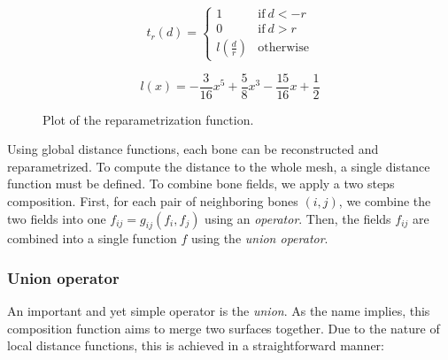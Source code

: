 \documentclass[a4paper,10pt]{article}
\begin{document}
\begin{multicols}{2}
\begin{equation*}
t_r(d) = \left\{ \begin{array}{ll}
1 & \mathrm{if\ }d < -r \\
0 & \mathrm{if\ }d > r \\
l(\frac{d}{r}) & \mathrm{otherwise}
\end{array} \right.
\end{equation*}

\begin{equation*}
l(x) = -\frac{3}{16}x^5 + \frac{5}{8}x^3 - \frac{15}{16}x + \frac{1}{2}
\end{equation*}

\begin{figure}[H]
\centering
{}
\caption{Plot of the reparametrization function.}
\end{figure}

Using global distance functions, each bone can be reconstructed and reparametrized.
To compute the distance to the whole mesh, a single distance function must be defined.
To combine bone fields, we apply a two steps composition.
First, for each pair of neighboring bones $(i, j)$, we combine the two fields into one $f_{ij} = g_{ij}(f_i, f_j)$ using an \emph{operator}.
Then, the fields $f_{ij}$ are combined into a single function $f$ using the \emph{union operator}.


\subsubsection{Union operator}

An important and yet simple operator is the \emph{union}.
As the name implies, this composition function aims to merge two surfaces together.
Due to the nature of local distance functions, this is achieved in a straightforward manner:


\end{multicols}
\end{document}

